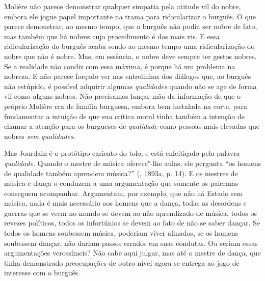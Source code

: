 Molière não parece demonstrar qualquer simpatia pela atitude vil do
nobre, embora ele jogue papel importante na trama para ridicularizar o
burguês. O que parece demonstrar, ao mesmo tempo, que o burguês não
podia ser nobre de fato, mas também que há nobres cujo procedimento é
dos mais vis. E essa ridicularização do burguês acaba sendo ao mesmo
tempo uma ridicularização do nobre que não é nobre. Mas, em essência, o
nobre deve sempre ter gestos nobres. Se a realidade não condiz com essa
máxima, é porque há um problema na nobreza. E não parece forçado ver nas
entrelinhas dos diálogos que, ao burguês não estúpido, é possível
adquirir algumas \emph{qualidades} quando não se age de forma vil como alguns nobres. Não
precisamos lançar mão da informação de que o próprio Molière era de
família burguesa, embora bem instalada na corte, para fundamentar a
intuição de que sua crítica moral tinha também a intenção de chamar a
atenção para os burgueses de \emph{qualidade} como pessoas mais elevadas
que nobres \emph{sem qualidades.}

Mas Jourdain é o protótipo caricato do tolo, e está enfeitiçado pela
palavra \emph{qualidade}. Quando o mestre de música oferece"-lhe aulas,
ele pergunta ``os homens de qualidade também aprendem música?''
(, 1893a, p. 14). E os mestres de música e dança o conduzem a uma
argumentação que somente os palermas conseguem acompanhar. Argumentam,
por exemplo, que não há Estado sem música, nada é mais necessário aos
homens que a dança, todas as desordens e guerras que se veem no mundo se
devem ao não aprendizado de música, todos os revezes políticos, todos os
infortúnios se devem ao fato de não se saber dançar. Se todos os homens
soubessem música, poderiam viver afinados, se os homens soubessem
dançar, não dariam passos errados em suas condutas. Ou seriam essas
argumentações verossímeis? Não cabe aqui julgar, mas até o mestre de
dança, que tinha demonstrado preocupações de outro nível agora se
entrega ao jogo de interesse com o burguês.

